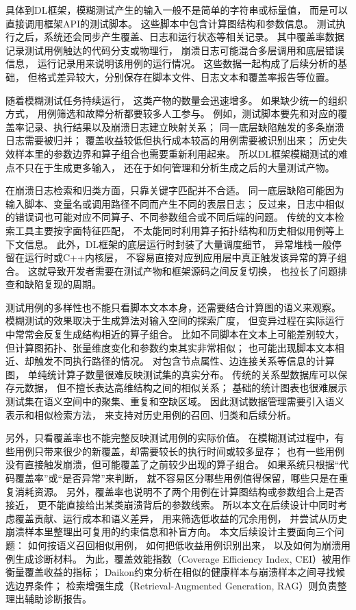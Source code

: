 具体到DL框架，模糊测试产生的输入一般不是简单的字符串或标量值，
而是可以直接调用框架API的测试脚本。
这些脚本中包含计算图结构和参数信息。
测试执行之后，系统还会同步产生覆盖、日志和运行状态等相关记录。
其中覆盖率数据记录测试用例触达的代码分支或物理行，
崩溃日志可能混合多层调用和底层错误信息，
运行记录用来说明该用例的运行情况。
这些数据一起构成了后续分析的基础，
但格式差异较大，分别保存在脚本文件、日志文本和覆盖率报告等位置。

随着模糊测试任务持续运行，
这类产物的数量会迅速增多。
如果缺少统一的组织方式，
用例筛选和故障分析都要较多人工参与。
例如，测试脚本要先和对应的覆盖率记录、执行结果以及崩溃日志建立映射关系；
同一底层缺陷触发的多条崩溃日志需要被归并；
覆盖收益较低但执行成本较高的用例需要被识别出来；
历史失效样本里的参数边界和算子组合也需要重新利用起来。
所以DL框架模糊测试的难点不只在于生成更多输入，
还在于如何管理和分析生成之后的大量测试产物。

在崩溃日志检索和归类方面，只靠关键字匹配并不合适。
同一底层缺陷可能因为输入脚本、变量名或调用路径不同而产生不同的表层日志；
反过来，日志中相似的错误词也可能对应不同算子、不同参数组合或不同后端的问题。
传统的文本检索工具主要按字面特征匹配，
不太能同时利用算子拓扑结构和历史相似用例等上下文信息。
此外，DL框架的底层运行时封装了大量调度细节，
异常堆栈一般停留在运行时或C++内核层，
不容易直接对应到应用层中真正触发该异常的算子组合。
这就导致开发者需要在测试产物和框架源码之间反复切换，
也拉长了问题排查和缺陷复现的周期\cite{ref_fault_localization}。

测试用例的多样性也不能只看脚本文本本身，还需要结合计算图的语义来观察。
模糊测试的效果取决于生成算法对输入空间的探索广度，
但变异过程在实际运行中常常会反复生成结构相近的算子组合。
比如不同脚本在文本上可能差别较大，
但计算图拓扑、张量维度变化和参数约束其实非常相似；
也可能出现脚本文本相近、却触发不同执行路径的情况。
对包含节点属性、边连接关系等信息的计算图，
单纯统计算子数量很难反映测试集的真实分布。
传统的关系型数据库可以保存元数据，
但不擅长表达高维结构之间的相似关系；
基础的统计图表也很难展示测试集在语义空间中的聚集、重复和空缺区域\cite{ref_test_diversity}。
因此测试数据管理需要引入语义表示和相似检索方法，
来支持对历史用例的召回、归类和后续分析。

另外，只看覆盖率也不能完整反映测试用例的实际价值。
在模糊测试过程中，有些用例只带来很少的新覆盖，却需要较长的执行时间或较多显存；
也有一些用例没有直接触发崩溃，但可能覆盖了之前较少出现的算子组合。
如果系统只根据“代码覆盖率”或“是否异常”来判断，
就不容易区分哪些用例值得保留，哪些只是在重复消耗资源。
另外，覆盖率也说明不了两个用例在计算图结构或参数组合上是否接近，
更不能直接给出某类崩溃背后的参数线索。
所以本文在后续设计中同时考虑覆盖贡献、运行成本和语义差异，
用来筛选低收益的冗余用例，
并尝试从历史崩溃样本里整理出可复用的约束信息和补盲方向\cite{ref_test_effectiveness}。
本文后续设计主要面向三个问题：
如何按语义召回相似用例，
如何把低收益用例识别出来，
以及如何为崩溃用例生成诊断材料。
为此，覆盖效能指数（Coverage Efficiency Index, CEI）被用作衡量覆盖收益的指标；
Daikon约束分析在相似的健康样本与崩溃样本之间寻找候选边界条件；
检索增强生成（Retrieval-Augmented Generation, RAG）则负责整理出辅助诊断报告。

